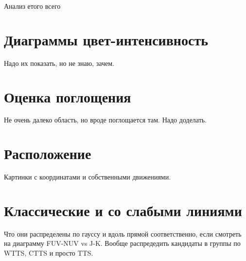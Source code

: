 Анализ етого всего

\section{Диаграммы цвет-интенсивность}
Надо их показать, но не знаю, зачем.

\section{Оценка поглощения}
Не очень далеко область, но вроде поглощается там. Надо доделать.

\section{Расположение}
Картинки с координатами и собственными движениями.

\section{Классические и со слабыми линиями}
Что они распределены по гауссу и вдоль прямой соответственно, если смотреть на диаграмму FUV-NUV vs J-K. Вообще распредедить кандидаты в группы по WTTS, CTTS и просто TTS.
